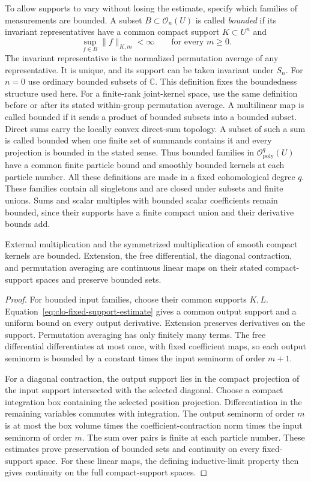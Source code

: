 To allow supports to vary without losing the estimate, specify which
families of measurements are bounded. A subset $B\subset\mathscr O_n(U)$
is called \emph{bounded} if its invariant representatives have a common
compact support $K\subset U^n$ and
\[
 \sup_{f\in B}\|f\|_{K,m}<\infty\qquad\text{for every }m\geq0.
\]
The invariant representative is the normalized permutation average of
any representative. It is unique, and its support can be taken invariant
under $S_n$. For $n=0$ use ordinary bounded subsets of $\mathbb C$.
This definition fixes the boundedness structure used here.
For a finite-rank joint-kernel space, use the same definition before
or after its stated within-group permutation average.
A multilinear map is called bounded if it sends a product of bounded
subsets into a bounded subset.
Direct sums carry the locally convex direct-sum topology.
A subset of such a sum is called bounded when one finite set of
summands contains it and every projection is bounded in the stated sense.
Thus bounded families in $\mathscr O_{\mathrm{poly}}^q(U)$ have a
common finite particle bound and smoothly bounded kernels at each
particle number. All these definitions are made in a fixed cohomological
degree $q$.
These families contain all singletons and are closed under subsets and
finite unions. Sums and scalar multiples with bounded scalar coefficients
remain bounded, since their supports have a finite compact union and
their derivative bounds add.

\begin{proposition}\label{prop:clo-bounded-multiplication}
External multiplication and the symmetrized multiplication of smooth
compact kernels are bounded. Extension, the free differential, the
diagonal contraction, and permutation averaging are continuous linear
maps on their stated compact-support spaces and preserve bounded sets.
\end{proposition}

\begin{proof}
For bounded input families, choose their common supports $K,L$.
Equation~\eqref{eq:clo-fixed-support-estimate} gives a common output
support and a uniform bound on every output derivative.
Extension preserves derivatives on the support.
Permutation averaging has only finitely many terms.
The free differential differentiates at most once, with fixed coefficient
maps, so each output seminorm is bounded by a constant times the input
seminorm of order $m+1$.

For a diagonal contraction, the output support lies in the compact
projection of the input support intersected with the selected diagonal.
Choose a compact integration box containing the selected position
projection. Differentiation in the remaining variables commutes with
integration. The output seminorm of order $m$ is at most the box volume
times the coefficient-contraction norm times the input seminorm of
order $m$. The sum over pairs is finite at each particle number.
These estimates prove preservation of bounded sets and continuity on
every fixed-support space. For these linear maps, the defining
inductive-limit property then gives continuity on the full
compact-support spaces.
\end{proof}

